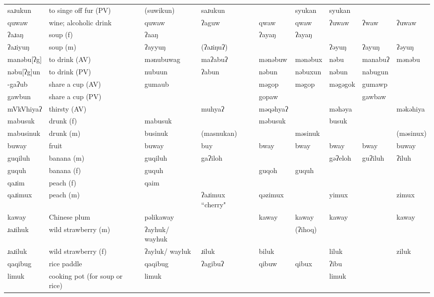 \begin{landscape}
\begin{longtable}{*{9}{>{\raggedright\arraybackslash}p{}}}
\text{*}saɹukun & to singe off fur (PV) & (suwikun) & saɹukun &  & syukan & syukan &  & \\
\text{*}quwaw & wine; alcoholic drink & quwaw & ʔaguw & qwaw & qwaw & ʔuwaw & ʔwaw & ʔuwaw\\
\text{*}ʔaɹaŋ & soup (f) & ʔaaŋ &  & ʔayaŋ & ʔayaŋ &  &  & \\
\text{*}ʔaɹiyuŋ & soup (m) & ʔayyuŋ & (ʔaɹiŋuʔ) &  &  & ʔəyuŋ & ʔayuŋ & ʔəyuŋ\\
\text{*}manəbu[ʔg] & to drink (AV) & mənubuwag & maʔabuʔ & mənəbuw & mənəbux & nəbu & manabuʔ & mənəbu\\
\text{*}nəbu[ʔg]un & to drink (PV) & nubuun & ʔabun & nəbun & nəbuxun & nəbun & nabugun & \\
\text{*}-gaʔub & share a cup (AV) & gumaub &  & məgop & məgop & məgəgok & gumawp & \\
\text{*}gawbun & share a cup (PV) &  &  & gopaw &  &  & gawbaw & \\
\text{*}mVkVhiyaʔ & thirsty (AV) &  & muhyaʔ & məqəhyaʔ &  & məhəya &  & məkəhiya\\
\text{*}mabusuk & drunk (f) & mabusuk &  & məbusuk &  & busuk &  & \\
\text{*}mabusinuk & drunk (m) & businuk & (masnukan) &  & məsinuk &  &  & (məsinux)\\
\text{*}buway & fruit & buway & buy & bway & bway & bway & bway & buway\\
\text{*}guqiluh & banana (m) & guqiluh & gaʔiloh &  &  & gəʔeloh & guʔiluh & ʔiluh\\
\text{*}guquh & banana (f) & guquh &  & guqoh & guquh &  &  & \\
\text{*}qaɹim & peach (f) & qaim &  &  &  &  &  & \\
\text{*}qaɹimux & peach (m) &  & ʔaɹimux ``cherry" & qəzimux &  & yimux &  & zimux\\
\text{*}kaway & Chinese plum & pəlikaway &  & kaway & kaway & kaway &  & kaway\\
\text{*}ɹaɹihuk & wild strawberry (m) & ʔayhuk/ \newline wayhuk &  &  & (ʔihoq) &  &  & \\
\text{*}ɹaɹiluk & wild strawberry (f) & ʔayluk/ \newline wayluk & ɹiluk & biluk &  & liluk &  & ziluk\\
\text{*}qaqibug & rice paddle & qaqibug & ʔagibuʔ & qibuw & qibux & ʔibu &  & \\
\text{*}limuk & cooking pot (for soup or rice) & limuk &  &  &  & limuk &  & \\

\end{longtable}
\end{landscape}

